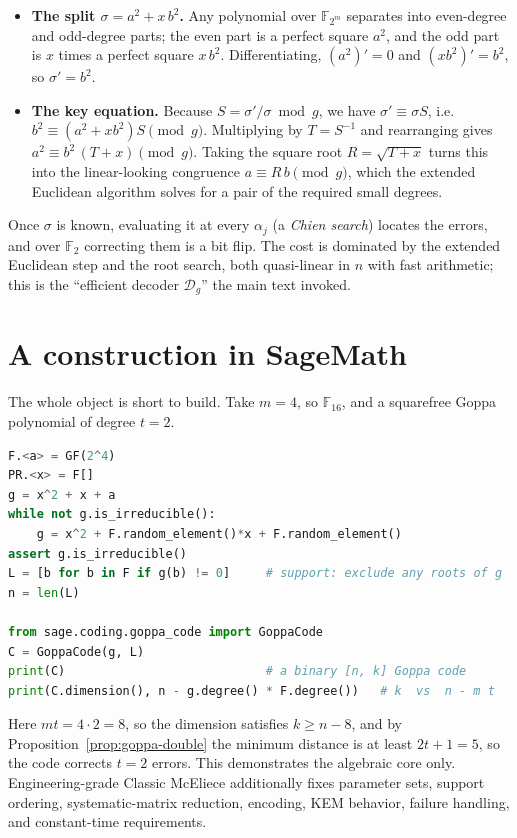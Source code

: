 \begin{itemize}
  \item \textbf{The split $\sigma=a^2+x\,b^2$.} Any polynomial over $\mathbb{F}_{2^m}$ separates into even-degree and odd-degree parts; the even part is a perfect square $a^2$, and the odd part is $x$ times a perfect square $x\,b^2$. Differentiating, $(a^2)'=0$ and $(x b^2)'=b^2$, so $\sigma'=b^2$.
  \item \textbf{The key equation.} Because $S=\sigma'/\sigma \bmod g$, we have $\sigma'\equiv \sigma S$, i.e.\ $b^2\equiv(a^2+xb^2)S \pmod g$. Multiplying by $T=S^{-1}$ and rearranging gives $a^2\equiv b^2\,(T+x)\pmod g$. Taking the square root $R=\sqrt{T+x}$ turns this into the linear-looking congruence $a\equiv R\,b\pmod g$, which the extended Euclidean algorithm solves for a pair of the required small degrees.
\end{itemize}

Once $\sigma$ is known, evaluating it at every $\alpha_j$ (a \emph{Chien search}) locates the errors, and over $\mathbb{F}_2$ correcting them is a bit flip. The cost is dominated by the extended Euclidean step and the root search, both quasi-linear in $n$ with fast arithmetic; this is the ``efficient decoder $\mathcal{D}_g$'' the main text invoked.

\section{A construction in SageMath}

The whole object is short to build. Take $m=4$, so $\mathbb{F}_{16}$, and a squarefree Goppa polynomial of degree $t=2$.

\begin{lstlisting}[language=Python]
F.<a> = GF(2^4)
PR.<x> = F[]
g = x^2 + x + a
while not g.is_irreducible():
    g = x^2 + F.random_element()*x + F.random_element()
assert g.is_irreducible()
L = [b for b in F if g(b) != 0]     # support: exclude any roots of g
n = len(L)

from sage.coding.goppa_code import GoppaCode
C = GoppaCode(g, L)
print(C)                            # a binary [n, k] Goppa code
print(C.dimension(), n - g.degree() * F.degree())   # k  vs  n - m t
\end{lstlisting}

Here $mt = 4\cdot 2 = 8$, so the dimension satisfies $k\ge n-8$, and by Proposition~\ref{prop:goppa-double} the minimum distance is at least $2t+1=5$, so the code corrects $t=2$ errors. This demonstrates the algebraic core only. Engineering-grade Classic McEliece additionally fixes parameter sets, support ordering, systematic-matrix reduction, encoding, KEM behavior, failure handling, and constant-time requirements.

